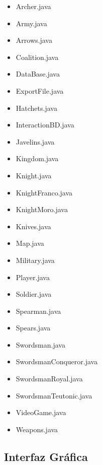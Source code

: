 \documentclass{article}
\begin{document}
	\begin{itemize}
		\item Archer.java
            \item Army.java
            \item Arrows.java
            \item Coalition.java
            \item DataBase.java
            \item ExportFile.java
            \item Hatchets.java
            \item InteractionBD.java
            \item Javelins.java
            \item Kingdom.java
            \item Knight.java
            \item KnightFranco.java
            \item KnightMoro.java
            \item Knives.java
            \item Map.java
            \item Military.java
            \item Player.java
            \item Soldier.java
            \item Spearman.java
            \item Spears.java
            \item Swordsman.java
            \item SwordsmanConqueror.java
            \item SwordsmanRoyal.java
            \item SwordsmanTeutonic.java
            \item VideoGame.java
            \item Weapons.java
	\end{itemize}
	

    
\subsection{Interfaz Gráfica}
	
\end{document}

